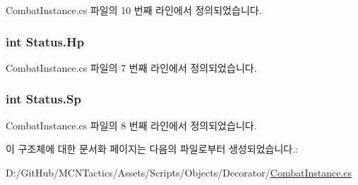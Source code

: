 Combat\+Instance.\+cs 파일의 10 번째 라인에서 정의되었습니다.

\subsubsection[{\texorpdfstring{Hp}{Hp}}]{\setlength{\rightskip}{0pt plus 5cm}int Status.\+Hp}\hypertarget{struct_status_a81b0c200ac8f8285e57cd4cc7bfd1fbf}{}\label{struct_status_a81b0c200ac8f8285e57cd4cc7bfd1fbf}


Combat\+Instance.\+cs 파일의 7 번째 라인에서 정의되었습니다.

\subsubsection[{\texorpdfstring{Sp}{Sp}}]{\setlength{\rightskip}{0pt plus 5cm}int Status.\+Sp}\hypertarget{struct_status_a71c109a2932f2f43a780485f6bf1209d}{}\label{struct_status_a71c109a2932f2f43a780485f6bf1209d}


Combat\+Instance.\+cs 파일의 8 번째 라인에서 정의되었습니다.



이 구조체에 대한 문서화 페이지는 다음의 파일로부터 생성되었습니다.\+:\begin{DoxyCompactItemize}
\item 
D\+:/\+Git\+Hub/\+M\+C\+N\+Tactics/\+Assets/\+Scripts/\+Objects/\+Decorator/\hyperlink{_combat_instance_8cs}{Combat\+Instance.\+cs}\end{DoxyCompactItemize}
